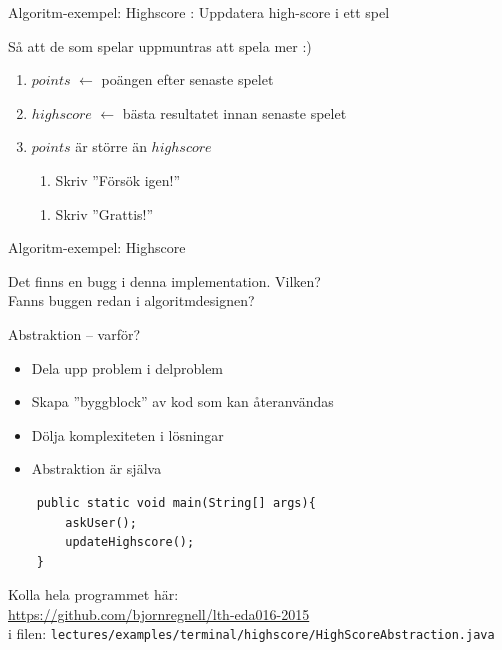 \documentclass{lecturenotes}
\begin{document}
\begin{Slide}{Algoritm-exempel: Highscore}
: Uppdatera high-score i ett spel \\ \vspace{1em}

 \pause Så att de som spelar uppmuntras att spela mer :) \\ \vspace{1em}

\pause
\begin{enumerate}
\item $points$ $\leftarrow$ poängen efter senaste spelet
\item $highscore$ $\leftarrow$ bästa resultatet innan senaste spelet
\item {} $points$ är större än $highscore$ 
\begin{enumerate}[ ~~]
\item  Skriv ''Försök igen!''
\end{enumerate}
\begin{enumerate}[ ~~]
\item  Skriv ''Grattis!''
\end{enumerate}
\end{enumerate}
\pause
\scriptsize {}
\end{Slide}

\begin{Slide}{Algoritm-exempel: Highscore}

Det finns en bugg i denna implementation. Vilken? \\ Fanns buggen redan i algoritmdesignen?
\end{Slide}

\begin{Slide}{Abstraktion -- varför?}
\begin{itemize}
\item Dela upp problem i delproblem
\item Skapa ''byggblock'' av kod som kan återanvändas
\item Dölja komplexiteten i lösningar
\item Abstraktion är själva 
\end{itemize}
\begin{lstlisting}
    public static void main(String[] args){
    	askUser();
    	updateHighscore();
    }
\end{lstlisting}
Kolla hela programmet här:\\ \href{https://github.com/bjornregnell/lth-eda016-2015/blob/master/lectures/examples/terminal/highscore/HighScoreAbstraction.java}{https://github.com/bjornregnell/lth-eda016-2015} \\
i filen: \scriptsize\texttt{lectures/examples/terminal/highscore/HighScoreAbstraction.java}
\end{Slide}
\end{document}

